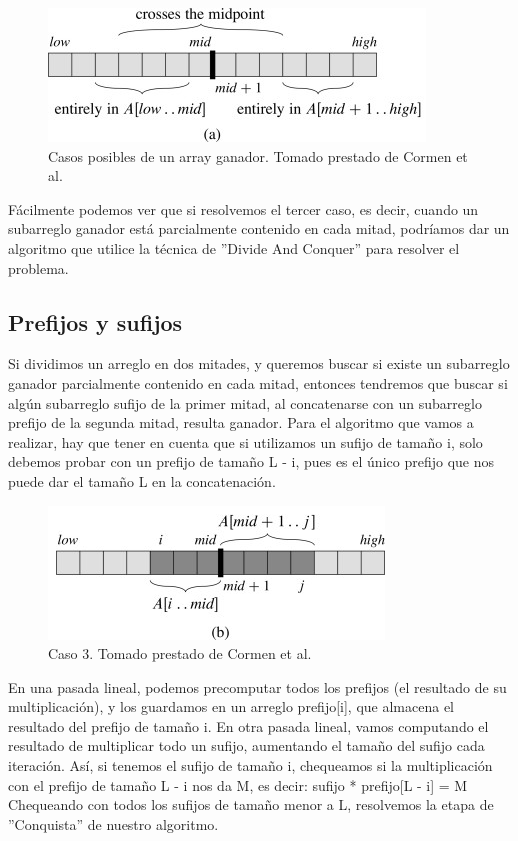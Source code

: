 \begin{figure}[H]
  \centering
    \includegraphics[scale=3]{img/subarrays-casos.jpg}
  \caption {Casos posibles de un array ganador. Tomado prestado de Cormen et al.\cite{cormen_algo}}
\end{figure}

Fácilmente podemos ver que si resolvemos el tercer caso, es decir, cuando un subarreglo
ganador está parcialmente contenido en cada mitad, podríamos dar un algoritmo
que utilice la técnica de ''Divide And Conquer'' para resolver el problema.

\subsection{Prefijos y sufijos}
Si dividimos un arreglo en dos mitades, y queremos buscar si existe un subarreglo ganador
parcialmente contenido en cada mitad, entonces tendremos que buscar si algún subarreglo
sufijo de la primer mitad, al concatenarse con un subarreglo prefijo de la segunda mitad,
resulta ganador.
Para el algoritmo que vamos a realizar, hay que tener en cuenta que si utilizamos un
sufijo de tamaño i, solo debemos probar con un prefijo de tamaño L - i, pues es el único prefijo
que nos puede dar el tamaño L en la concatenación.



\begin{figure}[H]
  \centering
    \includegraphics[scale=3]{img/subarrays-crossmid.jpg}
  \caption {Caso 3. Tomado prestado de Cormen et al.\cite{cormen_algo}}
\end{figure}

En una pasada lineal, podemos precomputar todos los prefijos (el resultado de su multiplicación),
y los guardamos en un arreglo prefijo[i], que almacena el resultado del prefijo de tamaño i.
\newline
En otra pasada lineal, vamos computando el resultado de multiplicar todo un sufijo, aumentando
el tamaño del sufijo cada iteración. Así, si tenemos el sufijo de tamaño i, chequeamos si
la multiplicación con el prefijo de tamaño L - i nos da M, es decir:
\newline
\newline
sufijo * prefijo[L - i] = M
\newline
\newline
Chequeando con todos los sufijos de tamaño menor a L, resolvemos la etapa de ''Conquista'' de nuestro
algoritmo.

